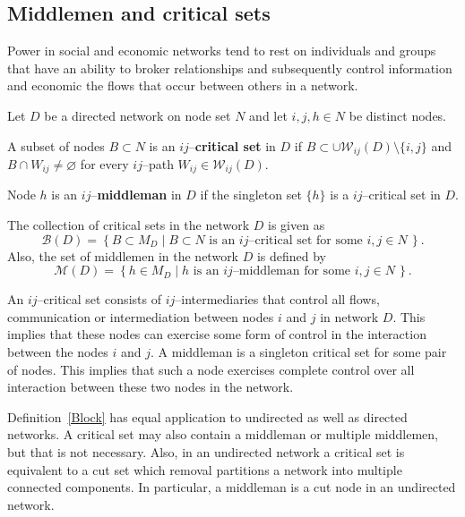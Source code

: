 \subsection{Middlemen and critical sets}

Power in social and economic networks tend to rest on individuals and groups that have an ability to broker relationships and subsequently control information and economic the flows that occur between others in a network.
\begin{definition} \label{Block}
Let $D$ be a directed network on node set $N$ and let $i,j,h \in N$ be distinct nodes.
\begin{abet}

\item A subset of nodes $B \subset N$ is an $ij$--\textbf{critical set} in $D$ if $B \subset \cup \mathcal{W}_{ij}(D) \setminus \{i,j\}$ and $B \cap W_{ij} \neq \varnothing$ for every $ij$--path $W_{ij} \in \mathcal{W}_{ij}(D)$.

\item Node $h$ is an $ij$--\textbf{middleman} in $D$ if the singleton set $\{ h \}$ is a $ij$--critical set in $D$.

\item The collection of critical sets in the network $D$ is given as
\begin{equation}
\mathcal{B}(D) = \left\{ B \subset M_D \mid B \subset N \mbox{ is an $ij$--critical set for some } i,j \in N \, \right\} .
\end{equation}
Also, the set of middlemen in the network $D$ is defined by
\begin{equation}
\mathcal{M}(D) = \left\{ h \in M_D \mid h \mbox{ is an $ij$--middleman for some } i,j \in N \, \right\} .
\end{equation}

\end{abet}
\end{definition}
An $ij$--critical set consists of $ij$--intermediaries that control all flows, communication or intermediation between nodes $i$ and $j$ in network $D$. This implies that these nodes can exercise some form of control in the interaction between the nodes $i$ and $j$. A middleman is a singleton critical set for some pair of nodes. This implies that such a node exercises complete control over all interaction between these two nodes in the network.

Definition~\ref{Block} has equal application to undirected as well as directed networks. A critical set may also contain a middleman or multiple middlemen, but that is not necessary. Also, in an undirected network a critical set is equivalent to a cut set which removal partitions a network into multiple connected components. In particular, a middleman is a cut node in an undirected network.

